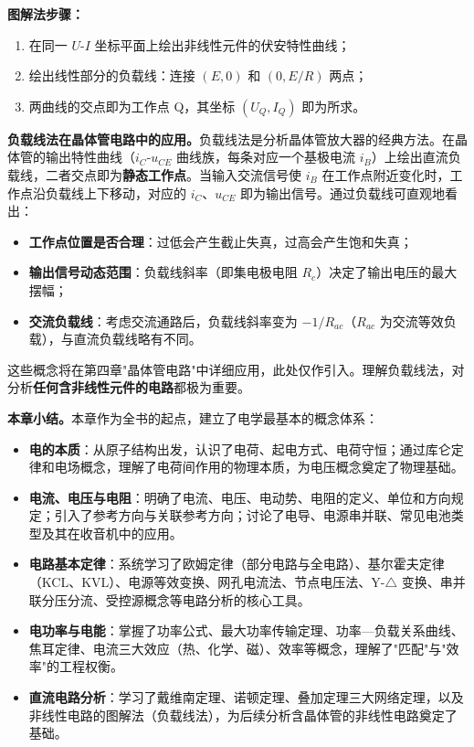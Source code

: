\documentclass[12pt,UTF8]{ctexbook}
\begin{document}
\textbf{图解法步骤：}
\begin{enumerate}
  \item 在同一 $U$-$I$ 坐标平面上绘出非线性元件的伏安特性曲线；
  \item 绘出线性部分的负载线：连接 $(E, 0)$ 和 $(0, E/R)$ 两点；
  \item 两曲线的交点即为工作点 Q，其坐标 $(U_Q, I_Q)$ 即为所求。
\end{enumerate}

\textbf{负载线法在晶体管电路中的应用。}负载线法是分析晶体管放大器的经典方法。在晶体管的输出特性曲线（$i_C$-$u_{CE}$ 曲线族，每条对应一个基极电流 $i_B$）上绘出直流负载线，二者交点即为\textbf{静态工作点}。当输入交流信号使 $i_B$ 在工作点附近变化时，工作点沿负载线上下移动，对应的 $i_C$、$u_{CE}$ 即为输出信号。通过负载线可直观地看出：
\begin{itemize}
  \item \textbf{工作点位置是否合理}：过低会产生截止失真，过高会产生饱和失真；
  \item \textbf{输出信号动态范围}：负载线斜率（即集电极电阻 $R_c$）决定了输出电压的最大摆幅；
  \item \textbf{交流负载线}：考虑交流通路后，负载线斜率变为 $-1/R_{ac}$（$R_{ac}$ 为交流等效负载），与直流负载线略有不同。
\end{itemize}

这些概念将在第四章"晶体管电路"中详细应用，此处仅作引入。理解负载线法，对分析\textbf{任何含非线性元件的电路}都极为重要。

\textbf{本章小结。}本章作为全书的起点，建立了电学最基本的概念体系：

\begin{itemize}
  \item \textbf{电的本质}：从原子结构出发，认识了电荷、起电方式、电荷守恒；通过库仑定律和电场概念，理解了电荷间作用的物理本质，为电压概念奠定了物理基础。
  \item \textbf{电流、电压与电阻}：明确了电流、电压、电动势、电阻的定义、单位和方向规定；引入了参考方向与关联参考方向；讨论了电导、电源串并联、常见电池类型及其在收音机中的应用。
  \item \textbf{电路基本定律}：系统学习了欧姆定律（部分电路与全电路）、基尔霍夫定律（KCL、KVL）、电源等效变换、网孔电流法、节点电压法、Y-$\triangle$ 变换、串并联分压分流、受控源概念等电路分析的核心工具。
  \item \textbf{电功率与电能}：掌握了功率公式、最大功率传输定理、功率—负载关系曲线、焦耳定律、电流三大效应（热、化学、磁）、效率等概念，理解了"匹配"与"效率"的工程权衡。
  \item \textbf{直流电路分析}：学习了戴维南定理、诺顿定理、叠加定理三大网络定理，以及非线性电路的图解法（负载线法），为后续分析含晶体管的非线性电路奠定了基础。
\end{itemize}
\end{document}
